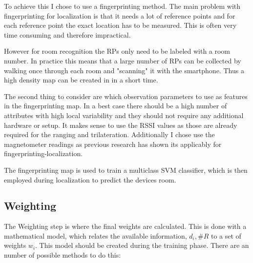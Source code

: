 To achieve this I chose to use a fingerprinting method. The main problem with fingerprinting for  localization is that it needs a lot of reference points and for each reference point the exact location has to be measured. This is often very time consuming and therefore impractical.

However for room recognition the RPs only need to be labeled with a room number. In practice this means that a large number of RPs can be collected by walking once through each room and "scanning" it with the smartphone. Thus a high density map can be created in in a short time.

The second thing to consider are which observation parameters to use as features in the fingerprinting map. In a best case there should be a high number of attributes with high local variability and they should not require any additional hardware or setup. It makes sense to use the RSSI values as those are already required for the ranging and trilateration. Additionally I chose use the magnetometer readings as previous research has shown its applicably for fingerprinting-localization.

The fingerprinting map is used to train a multiclass SVM classifier, which is then employed during localization to predict the devices room.

\subsection{Weighting}

The Weighting step is where the final weights are calculated. This is done with a mathematical model, which relates the available information, \(d_i,\#R\) to a set of weights \(w_i\). This model should be created during the training phase. There are an number of possible methods to do this:

